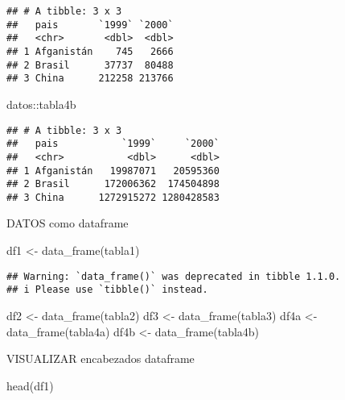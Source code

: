 \documentclass[
]{article}
\newenvironment{Shaded}{\begin{snugshade}}{\end{snugshade}}
\newcommand{\FunctionTok}[1]{\textcolor[rgb]{0.00,0.00,0.00}{#1}}
\newcommand{\NormalTok}[1]{#1}
\newcommand{\OtherTok}[1]{\textcolor[rgb]{0.56,0.35,0.01}{#1}}
\newcommand{\SpecialCharTok}[1]{\textcolor[rgb]{0.00,0.00,0.00}{#1}}
\begin{document}
\begin{verbatim}
## # A tibble: 3 x 3
##   pais       `1999` `2000`
##   <chr>       <dbl>  <dbl>
## 1 Afganistán    745   2666
## 2 Brasil      37737  80488
## 3 China      212258 213766
\end{verbatim}

\begin{Shaded}
\begin{Highlighting}[]
\NormalTok{datos}\SpecialCharTok{::}\NormalTok{tabla4b}
\end{Highlighting}
\end{Shaded}

\begin{verbatim}
## # A tibble: 3 x 3
##   pais           `1999`     `2000`
##   <chr>           <dbl>      <dbl>
## 1 Afganistán   19987071   20595360
## 2 Brasil      172006362  174504898
## 3 China      1272915272 1280428583
\end{verbatim}

DATOS como dataframe

\begin{Shaded}
\begin{Highlighting}[]
\NormalTok{df1 }\OtherTok{\textless{}{-}} \FunctionTok{data\_frame}\NormalTok{(tabla1)}
\end{Highlighting}
\end{Shaded}

\begin{verbatim}
## Warning: `data_frame()` was deprecated in tibble 1.1.0.
## i Please use `tibble()` instead.
\end{verbatim}

\begin{Shaded}
\begin{Highlighting}[]
\NormalTok{df2 }\OtherTok{\textless{}{-}} \FunctionTok{data\_frame}\NormalTok{(tabla2)}
\NormalTok{df3 }\OtherTok{\textless{}{-}} \FunctionTok{data\_frame}\NormalTok{(tabla3)}
\NormalTok{df4a }\OtherTok{\textless{}{-}} \FunctionTok{data\_frame}\NormalTok{(tabla4a)}
\NormalTok{df4b }\OtherTok{\textless{}{-}} \FunctionTok{data\_frame}\NormalTok{(tabla4b)}
\end{Highlighting}
\end{Shaded}

VISUALIZAR encabezados dataframe

\begin{Shaded}
\begin{Highlighting}[]
\FunctionTok{head}\NormalTok{(df1)}
\end{Highlighting}
\end{Shaded}
\end{document}
